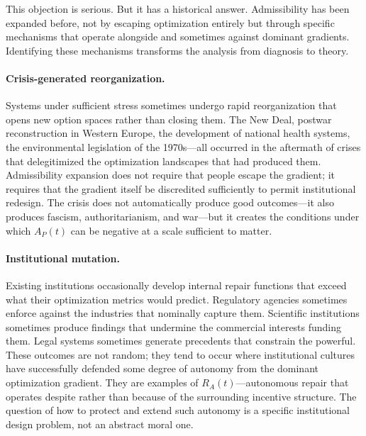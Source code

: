 \documentclass[11pt, letterpaper]{article}
\begin{document}
This objection is serious. But it has a historical answer. Admissibility has been expanded before, not by escaping optimization entirely but through specific mechanisms that operate alongside and sometimes against dominant gradients. Identifying these mechanisms transforms the analysis from diagnosis to theory.

\paragraph{Crisis-generated reorganization.} Systems under sufficient stress sometimes undergo rapid reorganization that opens new option spaces rather than closing them. The New Deal, postwar reconstruction in Western Europe, the development of national health systems, the environmental legislation of the 1970s---all occurred in the aftermath of crises that delegitimized the optimization landscapes that had produced them. Admissibility expansion does not require that people escape the gradient; it requires that the gradient itself be discredited sufficiently to permit institutional redesign. The crisis does not automatically produce good outcomes---it also produces fascism, authoritarianism, and war---but it creates the conditions under which $A_P(t)$ can be negative at a scale sufficient to matter.

\paragraph{Institutional mutation.} Existing institutions occasionally develop internal repair functions that exceed what their optimization metrics would predict. Regulatory agencies sometimes enforce against the industries that nominally capture them. Scientific institutions sometimes produce findings that undermine the commercial interests funding them. Legal systems sometimes generate precedents that constrain the powerful. These outcomes are not random; they tend to occur where institutional cultures have successfully defended some degree of autonomy from the dominant optimization gradient. They are examples of $R_A(t)$---autonomous repair that operates despite rather than because of the surrounding incentive structure. The question of how to protect and extend such autonomy is a specific institutional design problem, not an abstract moral one.
\end{document}
